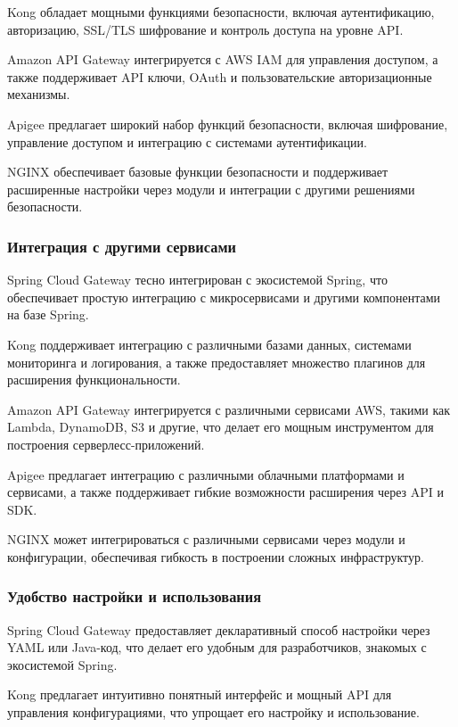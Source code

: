 Kong обладает мощными функциями безопасности, включая аутентификацию, авторизацию, SSL/TLS шифрование и контроль доступа
на уровне API\@.

Amazon API Gateway интегрируется с AWS IAM для управления доступом, а также поддерживает API ключи, OAuth и
пользовательские авторизационные механизмы.

Apigee предлагает широкий набор функций безопасности, включая шифрование, управление доступом и интеграцию с системами
аутентификации.

NGINX обеспечивает базовые функции безопасности и поддерживает расширенные настройки через модули и интеграции с другими
решениями безопасности.

\subsubsection{Интеграция с другими сервисами}

Spring Cloud Gateway тесно интегрирован с экосистемой Spring, что обеспечивает простую интеграцию с микросервисами и
другими компонентами на базе Spring.

Kong поддерживает интеграцию с различными базами данных, системами мониторинга и логирования, а также предоставляет
множество плагинов для расширения функциональности.

Amazon API Gateway интегрируется с различными сервисами AWS, такими как Lambda, DynamoDB, S3 и другие, что делает его
мощным инструментом для построения серверлесс-приложений.

Apigee предлагает интеграцию с различными облачными платформами и сервисами, а также поддерживает гибкие возможности
расширения через API и SDK\@.

NGINX может интегрироваться с различными сервисами через модули и конфигурации, обеспечивая гибкость в построении
сложных инфраструктур.

\subsubsection{Удобство настройки и использования}

Spring Cloud Gateway предоставляет декларативный способ настройки через YAML или Java-код, что делает его удобным для
разработчиков, знакомых с экосистемой Spring.

Kong предлагает интуитивно понятный интерфейс и мощный API для управления конфигурациями, что упрощает его настройку и
использование.

